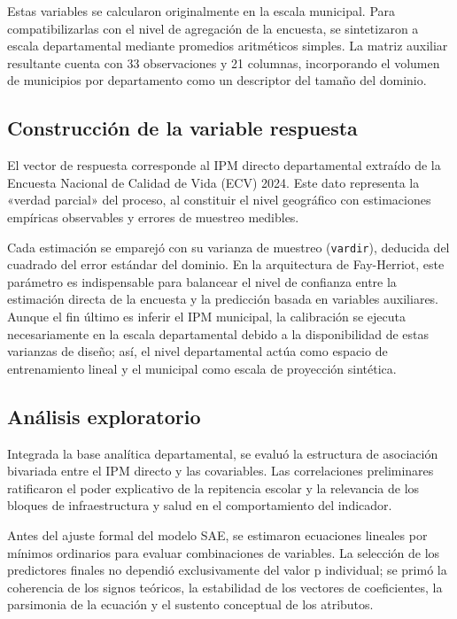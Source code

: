 Estas variables se calcularon originalmente en la escala municipal. Para compatibilizarlas con el nivel de agregación de la encuesta, se sintetizaron a escala departamental mediante promedios aritméticos simples. La matriz auxiliar resultante cuenta con 33 observaciones y 21 columnas, incorporando el volumen de municipios por departamento como un descriptor del tamaño del dominio.

\subsection{Construcción de la variable respuesta}
El vector de respuesta corresponde al IPM directo departamental extraído de la Encuesta Nacional de Calidad de Vida (ECV) 2024. Este dato representa la «verdad parcial» del proceso, al constituir el nivel geográfico con estimaciones empíricas observables y errores de muestreo medibles. 

Cada estimación se emparejó con su varianza de muestreo (\texttt{vardir}), deducida del cuadrado del error estándar del dominio. En la arquitectura de Fay-Herriot, este parámetro es indispensable para balancear el nivel de confianza entre la estimación directa de la encuesta y la predicción basada en variables auxiliares. Aunque el fin último es inferir el IPM municipal, la calibración se ejecuta necesariamente en la escala departamental debido a la disponibilidad de estas varianzas de diseño; así, el nivel departamental actúa como espacio de entrenamiento lineal y el municipal como escala de proyección sintética.

\subsection{Análisis exploratorio}
Integrada la base analítica departamental, se evaluó la estructura de asociación bivariada entre el IPM directo y las covariables. Las correlaciones preliminares ratificaron el poder explicativo de la repitencia escolar y la relevancia de los bloques de infraestructura y salud en el comportamiento del indicador.

Antes del ajuste formal del modelo SAE, se estimaron ecuaciones lineales por mínimos ordinarios para evaluar combinaciones de variables. La selección de los predictores finales no dependió exclusivamente del valor p individual; se primó la coherencia de los signos teóricos, la estabilidad de los vectores de coeficientes, la parsimonia de la ecuación y el sustento conceptual de los atributos. 

